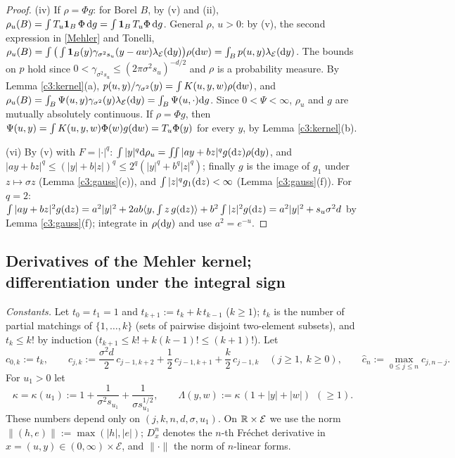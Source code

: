 \begin{proof}
(iv) If $\rho=\Phi g$: for Borel $B$, by (v) and (ii), $\rho_u(B)=\int T_u\mathbf 1_B\,\Phi\,\mathrm{d} g=\int\mathbf 1_B\,T_u\Phi\,\mathrm{d} g$.
General $\rho$, $u>0$: by (v), the second expression in \eqref{Mehler} and Tonelli, $\rho_u(B)=\int\big(\int\mathbf 1_B(y)\gamma_{\sigma^2s_u}(y-aw)\lambda_{\mathcal E}(\mathrm{d} y)\big)\rho(\mathrm{d} w)=\int_Bp(u,y)\lambda_{\mathcal E}(\mathrm{d} y)$.
The bounds on $p$ hold since $0<\gamma_{\sigma^2s_u}\le(2\pi\sigma^2s_u)^{-d/2}$ and $\rho$ is a probability measure.
By Lemma \ref{c3:kernel}(a), $p(u,y)/\gamma_{\sigma^2}(y)=\int K(u,y,w)\rho(\mathrm{d} w)$, and $\rho_u(B)=\int_B\Psi(u,y)\gamma_{\sigma^2}(y)\lambda_{\mathcal E}(\mathrm{d} y)=\int_B\Psi(u,\cdot)\mathrm{d} g$. Since $0<\Psi<\infty$, $\rho_u$ and $g$ are mutually absolutely continuous.
If $\rho=\Phi g$, then $\Psi(u,y)=\int K(u,y,w)\Phi(w)g(\mathrm{d} w)=T_u\Phi(y)$ for every $y$, by Lemma \ref{c3:kernel}(b).

(vi) By (v) with $F=|\cdot|^q$: $\int|y|^q\mathrm{d}\rho_u=\iint|ay+bz|^qg(\mathrm{d} z)\rho(\mathrm{d} y)$, and $|ay+bz|^q\le(|y|+b|z|)^q\le2^q(|y|^q+b^q|z|^q)$; finally $g$ is the image of $g_1$ under $z\mapsto\sigma z$ (Lemma \ref{c3:gauss}(c)), and $\int|z|^qg_1(\mathrm{d} z)<\infty$ (Lemma \ref{c3:gauss}(f)).
For $q=2$: $\int|ay+bz|^2g(\mathrm{d} z)=a^2|y|^2+2ab\langle y,\int z\,g(\mathrm{d} z)\rangle+b^2\int|z|^2g(\mathrm{d} z)=a^2|y|^2+s_u\sigma^2d$ by Lemma \ref{c3:gauss}(f); integrate in $\rho(\mathrm{d} y)$ and use $a^2=e^{-u}$.
\end{proof}

\subsection{Derivatives of the Mehler kernel; differentiation under the integral sign}\label{c3:ss:deriv}

\emph{Constants.} Let $t_0=t_1=1$ and $t_{k+1}:=t_k+k\,t_{k-1}$ ($k\ge1$); $t_k$ is the number of partial matchings of $\{1,\dots,k\}$ (sets of pairwise disjoint two-element subsets), and $t_k\le k!$ by induction ($t_{k+1}\le k!+k(k-1)!\le(k+1)!$).
Let
\[
c_{0,k}:=t_k,\qquad c_{j,k}:=\frac{\sigma^2d}{2}\,c_{j-1,k+2}+\frac12\,c_{j-1,k+1}+\frac k2\,c_{j-1,k}\quad(j\ge1,\ k\ge0),\qquad \hat c_n:=\max_{0\le j\le n}c_{j,n-j}.
\]
For $u_1>0$ let
\[
\kappa=\kappa(u_1):=1+\frac{1}{\sigma^2s_{u_1}}+\frac{1}{\sigma s_{u_1}^{1/2}},\qquad \Lambda(y,w):=\kappa\,(1+|y|+|w|)\ \ (\ge1).
\]
These numbers depend only on $(j,k,n,d,\sigma,u_1)$. On $\mathbb{R}\times\mathcal E$ we use the norm $\|(h,e)\|:=\max(|h|,|e|)$; $D^n_x$ denotes the $n$-th Fr\'echet derivative in $x=(u,y)\in(0,\infty)\times\mathcal E$, and $\|\cdot\|$ the norm of $n$-linear forms.

